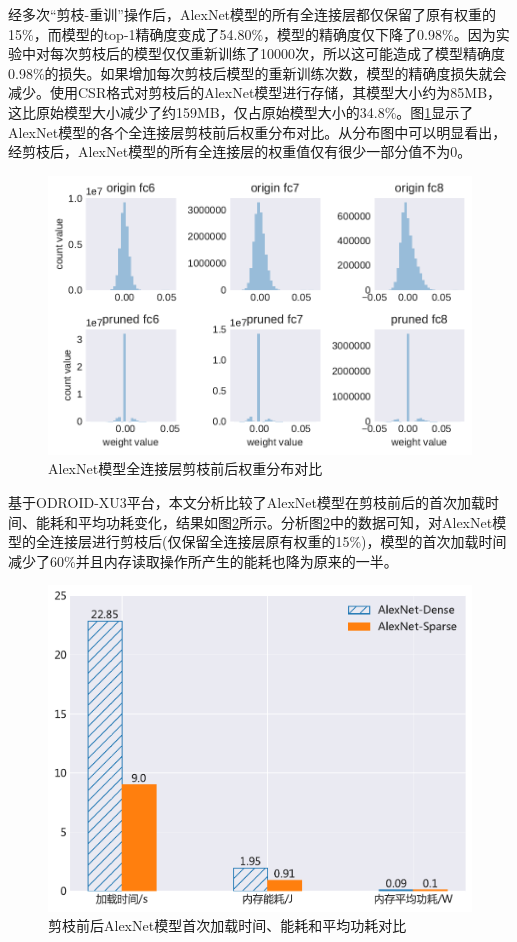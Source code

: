 经多次“剪枝-重训”操作后，AlexNet模型的所有全连接层都仅保留了原有权重的15\%，而模型的top-1精确度变成了54.80\%，模型的精确度仅下降了0.98\%。因为实验中对每次剪枝后的模型仅仅重新训练了10000次，所以这可能造成了模型精确度0.98\%的损失。如果增加每次剪枝后模型的重新训练次数，模型的精确度损失就会减少。使用CSR格式对剪枝后的AlexNet模型进行存储，其模型大小约为85MB，这比原始模型大小减少了约159MB，仅占原始模型大小的34.8\%。图\ref{figure:figure24}显示了AlexNet模型的各个全连接层剪枝前后权重分布对比。从分布图中可以明显看出，经剪枝后，AlexNet模型的所有全连接层的权重值仅有很少一部分值不为0。

\begin{figure}[htbp]
    \centering
    \includegraphics[height=0.45\textwidth]{figures/alexnet_pruned_weights.pdf}
    \caption{AlexNet模型全连接层剪枝前后权重分布对比}\label{figure:figure24}
\end{figure}


基于ODROID-XU3平台，本文分析比较了AlexNet模型在剪枝前后的首次加载时间、能耗和平均功耗变化，结果如图\ref{figure:figure27}所示。分析图\ref{figure:figure27}中的数据可知，对AlexNet模型的全连接层进行剪枝后(仅保留全连接层原有权重的15\%)，模型的首次加载时间减少了60\%并且内存读取操作所产生的能耗也降为原来的一半。

\begin{figure}[htbp]
    \centering
    \includegraphics[height=0.4\textwidth]{figures/alexnet_init.pdf}
    \caption{剪枝前后AlexNet模型首次加载时间、能耗和平均功耗对比}\label{figure:figure27}
\end{figure}

